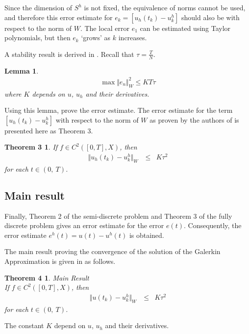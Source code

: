\documentclass[../../main.tex]{subfiles}
\begin{document}
Since the dimension of $S^h$ is not fixed, the equivalence of norms
cannot be used, and therefore this error estimate for $e_k = [u_h(t_k) - u^h_k]$
should also be with respect to the norm of $W$. The local error $e_1$ can be estimated using Taylor polynomials, but then $e_k$ `grows' as $k$ increases.

A stability result is derived in \cite{BV13}. Recall that $\displaystyle \tau = \frac{T}{N}$.

\newtheorem*{DC_Lem3}{Lemma}
\begin{DC_Lem3}
	\begin{eqnarray*}
		\max\Vert e_{n}\Vert_{W}^{2}\leq KT\tau
	\end{eqnarray*}
	where $K$ depends on $u$, $u_h$ and their derivatives.
\end{DC_Lem3}


Using this lemma, \cite{BV13} prove the error estimate. The error estimate for the term $[u_h(t_k) - u^h_k]$ with respect to the norm of $W$ as proven by the authors of \cite{BV13} is presented here as Theorem 3.

\newtheorem*{DC_Thm5_1}{Theorem 3}
\begin{DC_Thm5_1}
	If $f\in C^{2}([0,T],X)$, then
	\begin{eqnarray*}
		\Vert u_h(t_{k})-u_{k}^{h}\Vert_{W}\ & \leq & K\tau^2
	\end{eqnarray*}
	for each $t\in(0,\ T)$.
\end{DC_Thm5_1}

\subsection{Main result}
Finally, Theorem 2 of the semi-discrete problem and Theorem 3 of the fully
discrete problem gives an error estimate for the error $e(t)$. Consequently,
the error estimate $e^h(t) = u(t) - u^h(t)$ is obtained.

The main result proving the convergence of the solution of the Galerkin
Approximation is given in \cite{BV13} as follows.
\newtheorem*{DC_Thm5}{Theorem 4}
\begin{DC_Thm5}
	{Main Result}\\
	If $f\in C^{2}([0,T],X)$, then
	\begin{eqnarray*}
		\Vert u(t_{k})-u_{k}^{h}\Vert_{W}\ & \leq & K\tau^2
	\end{eqnarray*}
	for each $t\in(0,\ T)$.
\end{DC_Thm5}

The constant $K$ depend on $u$, $u_h$ and their derivatives.
\end{document}
